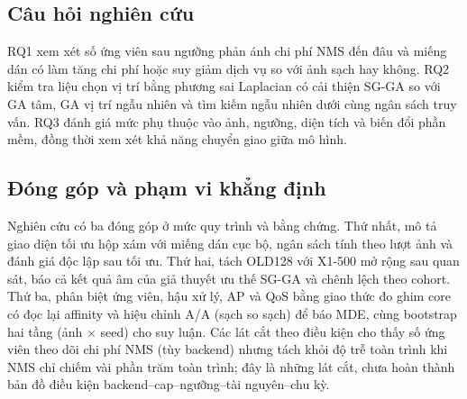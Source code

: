\documentclass[a4paper,fleqn]{cas-dc}
\newif\ifbranchB
\begin{document}
\subsection{Câu hỏi nghiên cứu}

RQ1 xem xét số ứng viên sau ngưỡng phản ánh chi phí NMS đến đâu và miếng dán có làm tăng chi phí hoặc suy giảm dịch vụ so với ảnh sạch hay không. RQ2 kiểm tra liệu chọn vị trí bằng phương sai Laplacian có cải thiện SG-GA so với GA tâm, GA vị trí ngẫu nhiên và tìm kiếm ngẫu nhiên dưới cùng ngân sách truy vấn. RQ3 đánh giá mức phụ thuộc vào ảnh, ngưỡng, diện tích và biến đổi phần mềm, đồng thời xem xét khả năng chuyển giao giữa mô hình.

\ifbranchB
Thực nghiệm detector quy mô lớn bổ sung một mục tiêu triển khai: lựa chọn mô hình theo chất lượng phát hiện người, ngân sách fine-tuning và latency. Mục tiêu này hỗ trợ thiết kế phép thử tính sẵn sàng tiếp theo; nó không thay ba câu hỏi về Sponge Patch và không được coi là thí nghiệm sạch--tấn công trên YOLO11, YOLOv12 hoặc YOLOv13.
\fi

\subsection{Đóng góp và phạm vi khẳng định}

Nghiên cứu có ba đóng góp ở mức quy trình và bằng chứng. Thứ nhất, mô tả giao diện tối ưu hộp xám với miếng dán cục bộ, ngân sách tính theo lượt ảnh và đánh giá độc lập sau tối ưu. Thứ hai, tách OLD128 với X1-500 mở rộng sau quan sát, báo cả kết quả âm của giả thuyết ưu thế SG-GA và chênh lệch theo cohort. Thứ ba, phân biệt ứng viên, hậu xử lý, AP và QoS bằng giao thức đo ghim core có đọc lại affinity và hiệu chỉnh A/A (sạch so sạch) để báo MDE, cùng bootstrap hai tầng (ảnh $\times$ seed) cho suy luận. Các lát cắt theo điều kiện cho thấy số ứng viên theo dõi chi phí NMS (tùy backend) nhưng tách khỏi độ trễ toàn trình khi NMS chỉ chiếm vài phần trăm toàn trình; đây là những lát cắt, chưa hoàn thành bản đồ điều kiện backend--cap--ngưỡng--tài nguyên--chu kỳ. \ifbranchB Benchmark detector theo thời gian huấn luyện được giữ riêng để tác giả duyệt phạm vi.\fi
\end{document}

